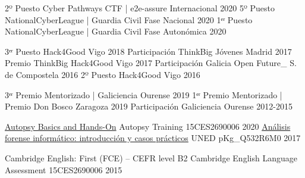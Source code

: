 \documentclass[11pt, a4paper]{style}
\begin{document}
\cvsubsection{\\\\Hacking}
\begin{cvhonors}
  \cvhonor
    {2º Puesto} %
    {Cyber Pathways CTF | e2e-assure} %
    {Internacional} %
    {2020} %
  \cvhonor
    {5º Puesto} %
    {NationalCyberLeague | Guardia Civil} %
    {Fase Nacional} %
    {2020} %
  \cvhonor
    {1ᵉʳ Puesto} %
    {NationalCyberLeague | Guardia Civil} %
    {Fase Autonómica} %
    {2020} %
\end{cvhonors}
\begin{cvhonors}
  \cvhonor
    {3ᵉʳ Puesto} %
    {Hack4Good} %
    {Vigo} %
    {2018} %
  \cvhonor
    {Participación} %
    {ThinkBig Jóvenes} %
    {Madrid} %
    {2017} %
  \cvhonor
    {Premio ThinkBig} %
    {Hack4Good} %
    {Vigo} %
    {2017} %
  \cvhonor
    {Participación} %
    {Galicia Open Future\_} %
    {S. de Compostela} %
    {2016} %
  \cvhonor
    {2º Puesto} %
    {Hack4Good} %
    {Vigo} %
    {2016} %
\end{cvhonors}
\begin{cvhonors}
  \cvhonor
    {3ᵉʳ Premio} %
    {Mentorizado | Galiciencia} %
    {Ourense} %
    {2019} %
  \cvhonor
    {1ᵉʳ Premio} %
    {Mentorizado | Premio Don Bosco} %
    {Zaragoza} %
    {2019} %
  \cvhonor
    {Participación} %
    {Galiciencia} %
    {Ourense} %
    {2012-2015} %
\end{cvhonors}
\begin{cvhonors}
  \cvhonor
    {\href{https://training.autopsy.com/certificates/whyhnafde1}{Autopsy Basics and Hands-On}} %
    {Autopsy Training} %
    {15CES2690006} %
    {2020} %
  \cvhonor
    {\href{https://extension.uned.es/ajax/ops.php?espacio=exportacion&clase=Doc&funcion=certificado&var1=pKg+Q532R6M0&json=0&op=accion}{Análisis forense informático: introducción y casos prácticos}} %
    {UNED} %
    {pKg\_Q532R6M0} %
    {2017} %
\end{cvhonors}
\begin{cvhonors}
  \cvhonor
    {Cambridge English: First (FCE) – CEFR level B2} %
    {Cambridge English Language Assessment} %
    {15CES2690006} %
    {2015} %
\end{cvhonors}
\end{document}

